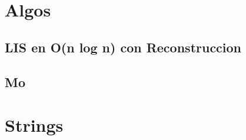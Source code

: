 

\section{Algos}%

\subsection{LIS en O(n log n) con Reconstruccion}

\subsection{Mo}







\section{Strings}%
